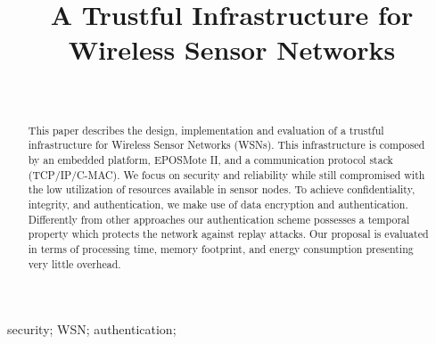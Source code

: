 \documentclass[conference]{IEEEtran}
\begin{document}
\title{A Trustful Infrastructure for Wireless Sensor Networks}

\author{
    \\
}

\maketitle

\begin{abstract}
This paper describes the design, implementation and evaluation of a trustful infrastructure for Wireless Sensor Networks (WSNs).
This infrastructure is composed by an embedded platform, EPOSMote II, and a communication protocol stack (TCP/IP/C-MAC).
We focus on security and reliability while still compromised with the low utilization of resources available in sensor nodes. 
To achieve confidentiality, integrity, and authentication, we make use of data encryption and authentication.
Differently from other approaches our authentication scheme possesses a temporal property which protects the network against replay attacks.
Our proposal is evaluated in terms of processing time, memory footprint, and energy consumption presenting very little overhead.

\end{abstract}

\begin{IEEEkeywords}
  security; WSN; authentication;
\end{IEEEkeywords}



%









\end{document}
